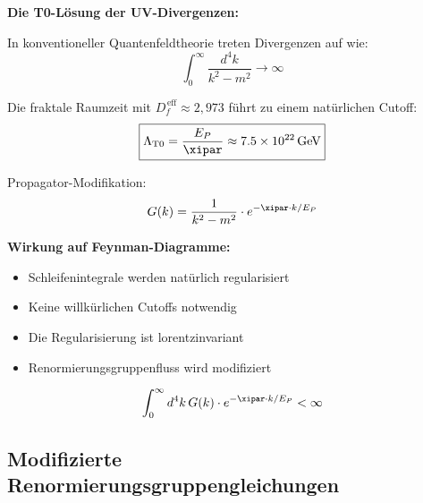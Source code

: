 	\begin{anwendung}
		\textbf{Die T0-Lösung der UV-Divergenzen:}
		
		In konventioneller Quantenfeldtheorie treten Divergenzen auf wie:
		\begin{equation}
			\int_0^\infty \frac{d^4k}{k^2 - m^2} \to \infty
		\end{equation}
		
		Die fraktale Raumzeit mit $D_f^{\,\text{eff}} \approx 2{,}973$ führt zu einem natürlichen Cutoff:
		\begin{equation}
			\boxed{\Lambda_{\text{T0}} = \frac{E_P}{\xipar} \approx 7.5 \times 10^{22}\, \text{GeV}}
		\end{equation}
		
		Propagator-Modifikation:
		\begin{equation}
			G(k) = \frac{1}{k^2 - m^2} \cdot e^{-\xipar \cdot k/E_P}
		\end{equation}
		
		\textbf{Wirkung auf Feynman-Diagramme:}
		\begin{itemize}
			\item Schleifenintegrale werden natürlich regularisiert
			\item Keine willkürlichen Cutoffs notwendig
			\item Die Regularisierung ist lorentzinvariant
			\item Renormierungsgruppenfluss wird modifiziert
		\end{itemize}
		
		\begin{equation}
			\int_0^\infty d^4k\, G(k) \cdot e^{-\xipar \cdot k/E_P} < \infty
		\end{equation}
	\end{anwendung}
	
	\subsection{Modifizierte Renormierungsgruppengleichungen}
	
